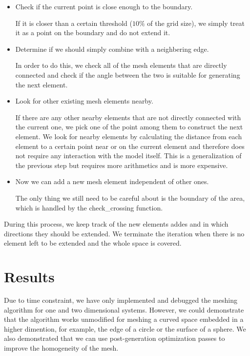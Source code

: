 \documentclass[10pt,fleqn]{article}
\begin{document}
\begin{itemize}
\item Check if the current point is close enough to the boundary.

  If it is closer than a certain threshold ($10\%$ of the grid size), we
  simply treat it as a point on the boundary and do not extend it.

\item Determine if we should simply combine with a neighbering edge.

  In order to do this, we check all of the mesh elements that are directly
  connected and check if the angle between the two is suitable for generating
  the next element.

\item Look for other existing mesh elements nearby.

  If there are any other nearby elements that are not directly connected with
  the current one, we pick one of the point among them to construct the next
  element. We look for nearby elements by calculating the distance from each
  element to a certain point near or on the current element and therefore
  does not require any interaction with the model itself. This is a
  generalization of the previous step but requires more arithmetics and is
  more expensive.

\item Now we can add a new mesh element independent of other ones.

  The only thing we still need to be careful about is the boundary of the
  area, which is handled by the check\_crossing function.
\end{itemize}

During this process, we keep track of the new elements addes and in which
directions they should be extended. We terminate the iteration when there is
no element left to be extended and the whole space is covered.

\section{Results}

Due to time constraint, we have only implemented and debugged the meshing
algorithm for one and two dimensional systems. However, we could demonstrate
that the algorithm works unmodified for meshing a curved space embedded in a
higher dimention, for example, the edge of a circle or the surface of a sphere.
We also demonstrated that we can use post-generation optimization passes to
improve the homogeneity of the mesh.
\end{document}
